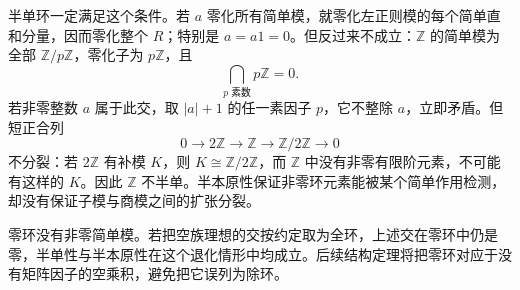 \ProseParagraphBreak
半单环一定满足这个条件。若 \(a\) 零化所有简单模，就零化左正则模的每个简单直和分量，因而零化整个 \(R\)；特别是 \(a=a1=0\)。但反过来不成立：\(\mathbb Z\) 的简单模为全部 \(\mathbb Z/p\mathbb Z\)，零化子为 \(p\mathbb Z\)，且
\[
	\bigcap_{p\text{ 素数}}p\mathbb Z=0.
\]
若非零整数 \(a\) 属于此交，取 \(|a|+1\) 的任一素因子 \(p\)，它不整除 \(a\)，立即矛盾。但短正合列
\[
	0\longrightarrow2\mathbb Z\longrightarrow\mathbb Z \longrightarrow\mathbb Z/2\mathbb Z\longrightarrow0
\]
不分裂：若 \(2\mathbb Z\) 有补模 \(K\)，则 \(K\cong\mathbb Z/2\mathbb Z\)，而 \(\mathbb Z\) 中没有非零有限阶元素，不可能有这样的 \(K\)。因此 \(\mathbb Z\) 不半单。半本原性保证非零环元素能被某个简单作用检测，却没有保证子模与商模之间的扩张分裂。

\ProseParagraphBreak
零环没有非零简单模。若把空族理想的交按约定取为全环，上述交在零环中仍是零，半单性与半本原性在这个退化情形中均成立。后续结构定理将把零环对应于没有矩阵因子的空乘积，避免把它误列为除环。
